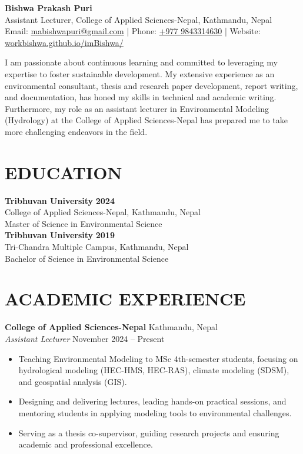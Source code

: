 \documentclass[a4paper,9pt]{extarticle}
\begin{document}
\pagestyle{fancy}
\renewcommand{\headrulewidth}{0pt}
\fancyhead{}
\thispagestyle{empty} 

\begin{flushleft}
\textbf{\LARGE Bishwa Prakash Puri}\\[2pt] 
Assistant Lecturer, College of Applied Sciences-Nepal, Kathmandu, Nepal\\
Email: \href{mailto:mabishwapuri@gmail.com}{mabishwapuri@gmail.com} |
Phone: \href{tel:+9779843314630}{+977 9843314630} | 
Website: \href{https://workbishwa.github.io/imBishwa/}{workbishwa.github.io/imBishwa/}

\end{flushleft}
I am passionate about continuous learning and committed to leveraging my expertise to foster sustainable development. My extensive experience as an environmental consultant, thesis and research paper development, report writing, and documentation, has honed my skills in technical and academic writing. Furthermore, my role as an assistant lecturer in Environmental Modeling (Hydrology) at the College of Applied Sciences-Nepal has prepared me to take more challenging endeavors in the field.


\section*{EDUCATION}

\textbf{Tribhuvan University} \hfill \textbf{2024}\\
College of Applied Sciences-Nepal, Kathmandu, Nepal\\
Master of Science in Environmental Science\\[0.5em]

\textbf{Tribhuvan University} \hfill \textbf{2019}\\
Tri-Chandra Multiple Campus, Kathmandu, Nepal\\
Bachelor of Science in Environmental Science


\section*{ACADEMIC EXPERIENCE}
\noindent
\textbf{College of Applied Sciences-Nepal} \hfill Kathmandu, Nepal\\ 
\textit{Assistant Lecturer} \hfill November 2024 -- Present 
\begin{itemize}
    \item Teaching Environmental Modeling to MSc 4th-semester students, focusing on hydrological modeling (HEC-HMS, HEC-RAS), climate modeling (SDSM), and geospatial analysis (GIS).
    \item Designing and delivering lectures, leading hands-on practical sessions, and mentoring students in applying modeling tools to environmental challenges.
    \item Serving as a thesis co-supervisor, guiding research projects and ensuring academic and professional excellence.
\end{itemize}
\end{document}
